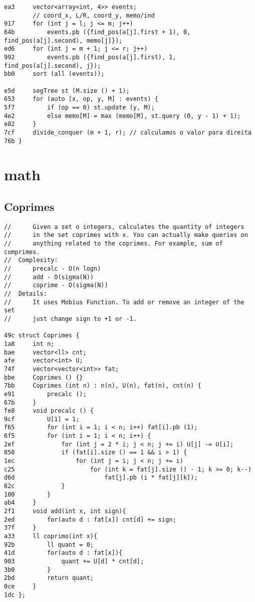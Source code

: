 \documentclass[11pt, a4paper, twoside]{article}
\begin{document}
\begin{lstlisting}
ea3     vector<array<int, 4>> events;
        // coord_x, L/R, coord_y, memo/ind
917     for (int j = l; j <= m; j++)
64b         events.pb ({find_pos(a[j].first + 1), 0, find_pos(a[j].second), memo[j]});
ed6     for (int j = m + 1; j <= r; j++)
992         events.pb ({find_pos(a[j].first), 1, find_pos(a[j].second), j});
bb0     sort (all (events));
    
e5d     segTree st (M.size () + 1);
653     for (auto [x, op, y, M] : events) {
5f7         if (op == 0) st.update (y, M);
4e2         else memo[M] = max (memo[M], st.query (0, y - 1) + 1);
e82     }
7cf     divide_conquer (m + 1, r); // calculamos o valor para direita
76b }
\end{lstlisting}



%
%

\section{math}

\subsection{ Coprimes}
\begin{lstlisting}
//      Given a set o integers, calculates the quantity of integers
//      in the set coprimes with x. You can actually make queries on
//      anything related to the coprimes. For example, sum of comprimes.
//  Complexity: 
//      precalc - O(n logn)
//      add - O(sigma(N))
//      coprime - O(sigma(N))
//  Details:
//      It uses Mobius Function. To add or remove an integer of the set
//      just change sign to +1 or -1.

49c struct Coprimes {
1a8     int n;
bae     vector<ll> cnt;
afe     vector<int> U;
74f     vector<vector<int>> fat;
bbe     Coprimes () {}
7bb     Coprimes (int n) : n(n), U(n), fat(n), cnt(n) {
e91         precalc ();
67b     }
fe8     void precalc () {
9cf         U[1] = 1;
f65         for (int i = 1; i < n; i++) fat[i].pb (1);
6f5         for (int i = 1; i < n; i++) {
2ef             for (int j = 2 * i; j < n; j += i) U[j] -= U[i];
850             if (fat[i].size () == 1 && i > 1) {
1ec                 for (int j = i; j < n; j += i)
c25                     for (int k = fat[j].size () - 1; k >= 0; k--) 
d6d                         fat[j].pb (i * fat[j][k]);
62c             }
100         }
ab4     }
2f1     void add(int x, int sign){
2ed         for(auto d : fat[x]) cnt[d] += sign;
37f     }
a33     ll coprimo(int x){
92b         ll quant = 0;
41d         for(auto d : fat[x]){
903             quant += U[d] * cnt[d];
3b0         }
2bd         return quant;
0ce     }
1dc };
\end{lstlisting}
\end{document}
